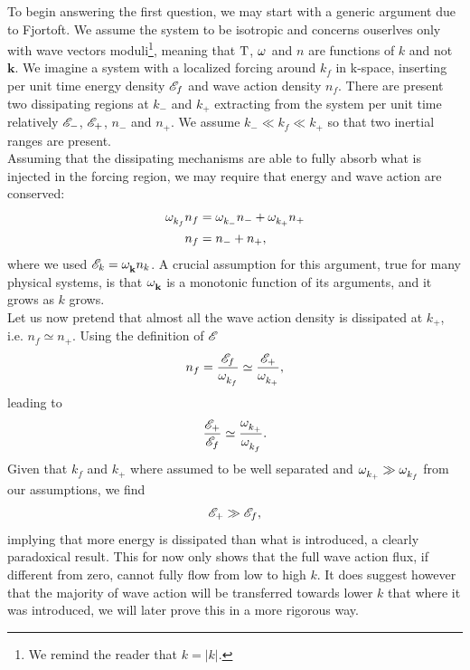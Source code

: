 To begin answering the first question, we may start with a generic argument due to Fjortoft. We assume the system to be isotropic and concerns ouserlves only with 
wave vectors moduli\footnote{We remind the reader that $k = |k|$.}, meaning that $\mathrm{T}$, $\omega^{}$ and $n$ are functions of $k$ and not $\mathbf{k}$. 
We imagine a system with a localized forcing 
around $k_f$ in k-space, inserting per unit time energy density $\mathscr{E}_f$ and wave action density $n_f$. There are present two dissipating regions at $k_-$ and $k_+$
extracting from the system per unit time relatively $\mathscr{E}_-$, $\mathscr{E}_+$, $n_-$ and $n_+$. We assume $k_- \ll k_f \ll k_+$ so that two inertial ranges are present.\\


Assuming that the dissipating mechanisms are able to fully absorb what is injected in the forcing region, we may require that energy and wave action are conserved:
\begin{align}
    \omega^{}_{k_f}n_f &=  \omega^{}_{k_-}n_- + \omega^{}_{k_+}n_+ \\
    n_f &= n_- + n_+,
\end{align}
where we used $\mathscr{E}_k = \omega^{}_{\mathbf{k}} n_k$. A crucial assumption for this argument, true for many physical systems, is that $\omega^{}_{\mathbf{k}}$ is a monotonic function 
of its arguments, and it grows as $k$ grows.\\
Let us now pretend that almost all the wave action density is dissipated at $k_+$, i.e. $n_f \simeq n_+$. Using the definition of $\mathscr{E}$ 
\begin{equation}
    n_f = \frac{\mathscr{E}_f}{\omega^{}_{k_f}} \simeq \frac{\mathscr{E}_+}{\omega^{}_{k_+}},
\end{equation}
leading to 
\begin{equation}
    \frac{\mathscr{E}_+}{\mathscr{E}_f} \simeq \frac{\omega^{}_{k_+}}{\omega^{}_{k_f}}.
\end{equation}
Given that $k_f$ and $k_+$ where assumed to be well separated and $\omega^{}_{k_+} \gg \omega^{}_{k_f}$ from our assumptions, we find 
\begin{equation}
    \mathscr{E}_+ \gg \mathscr{E}_f,
\end{equation}
implying that more energy is dissipated than what is introduced, a clearly paradoxical result. This for now only shows that the full wave action flux, if different from zero, cannot 
fully flow from low to high $k$. It does suggest however that the majority of wave action will be transferred towards lower $k$ that where it was introduced, we will 
later prove this in a more rigorous way. \\
